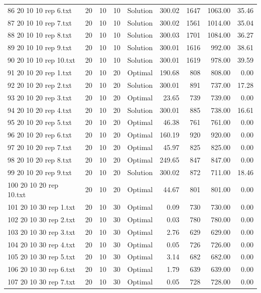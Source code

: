 \begin{longtable}{lrrllrrrr}
86 20 10 10 rep 6.txt & 20 & 10 & 10 & Solution & 300.02 & 1647 & 1063.00 & 35.46\\
87 20 10 10 rep 7.txt & 20 & 10 & 10 & Solution & 300.02 & 1561 & 1014.00 & 35.04\\
88 20 10 10 rep 8.txt & 20 & 10 & 10 & Solution & 300.03 & 1701 & 1084.00 & 36.27\\
89 20 10 10 rep 9.txt & 20 & 10 & 10 & Solution & 300.01 & 1616 & 992.00 & 38.61\\
90 20 10 10 rep 10.txt & 20 & 10 & 10 & Solution & 300.01 & 1619 & 978.00 & 39.59\\
91 20 10 20 rep 1.txt & 20 & 10 & 20 & Optimal & 190.68 & 808 & 808.00 &  0.00\\
92 20 10 20 rep 2.txt & 20 & 10 & 20 & Solution & 300.01 & 891 & 737.00 & 17.28\\
93 20 10 20 rep 3.txt & 20 & 10 & 20 & Optimal & 23.65 & 739 & 739.00 &  0.00\\
94 20 10 20 rep 4.txt & 20 & 10 & 20 & Solution & 300.01 & 885 & 738.00 & 16.61\\
95 20 10 20 rep 5.txt & 20 & 10 & 20 & Optimal & 46.38 & 761 & 761.00 &  0.00\\
96 20 10 20 rep 6.txt & 20 & 10 & 20 & Optimal & 160.19 & 920 & 920.00 &  0.00\\
97 20 10 20 rep 7.txt & 20 & 10 & 20 & Optimal & 45.97 & 825 & 825.00 &  0.00\\
98 20 10 20 rep 8.txt & 20 & 10 & 20 & Optimal & 249.65 & 847 & 847.00 &  0.00\\
99 20 10 20 rep 9.txt & 20 & 10 & 20 & Solution & 300.02 & 872 & 711.00 & 18.46\\
100 20 10 20 rep 10.txt & 20 & 10 & 20 & Optimal & 44.67 & 801 & 801.00 &  0.00\\
101 20 10 30 rep 1.txt & 20 & 10 & 30 & Optimal &  0.09 & 730 & 730.00 &  0.00\\
102 20 10 30 rep 2.txt & 20 & 10 & 30 & Optimal &  0.03 & 780 & 780.00 &  0.00\\
103 20 10 30 rep 3.txt & 20 & 10 & 30 & Optimal &  2.76 & 629 & 629.00 &  0.00\\
104 20 10 30 rep 4.txt & 20 & 10 & 30 & Optimal &  0.05 & 726 & 726.00 &  0.00\\
105 20 10 30 rep 5.txt & 20 & 10 & 30 & Optimal &  3.14 & 682 & 682.00 &  0.00\\
106 20 10 30 rep 6.txt & 20 & 10 & 30 & Optimal &  1.79 & 639 & 639.00 &  0.00\\
107 20 10 30 rep 7.txt & 20 & 10 & 30 & Optimal &  0.05 & 728 & 728.00 &  0.00\\

\end{longtable}
